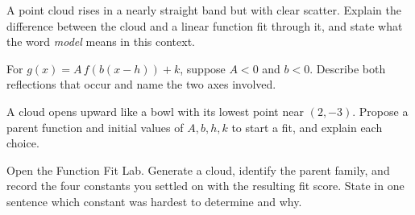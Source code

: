 \documentclass[12pt]{book}
\begin{document}
\begin{exercises}
\item A point cloud rises in a nearly straight band but with clear scatter. Explain
the difference between the cloud and a linear function fit through it, and state what
the word \emph{model} means in this context.

\item For $g(x)=A\,f(b(x-h))+k$, suppose $A<0$ and $b<0$. Describe both reflections
that occur and name the two axes involved.

\item A cloud opens upward like a bowl with its lowest point near $(2,-3)$. Propose
a parent function and initial values of $A,b,h,k$ to start a fit, and explain each
choice.

\item Open the Function Fit Lab. Generate a cloud, identify the parent family, and
record the four constants you settled on with the resulting fit score. State in one
sentence which constant was hardest to determine and why.
\end{exercises}
\end{document}
